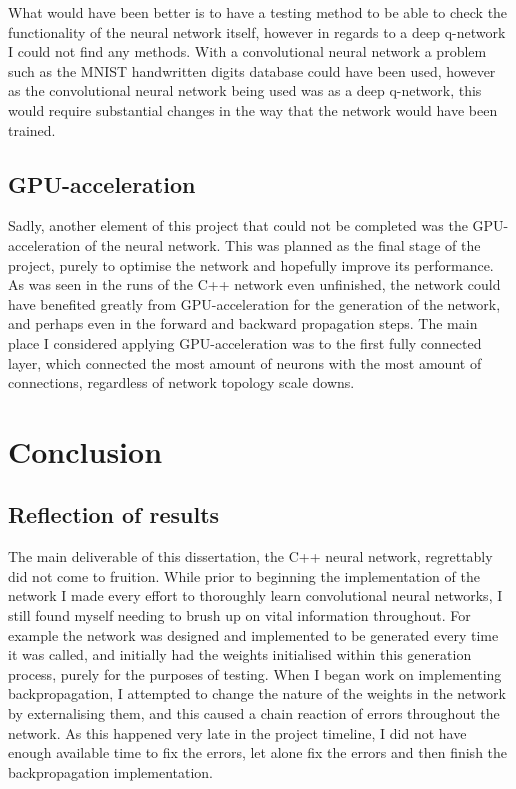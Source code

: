 \documentclass[10pt]{article}
\begin{document}
		What would have been better is to have a testing method to be able to check the functionality of the neural network itself, however in regards to a deep q-network I could not find any methods. With a convolutional neural network a problem such as the MNIST handwritten digits database could have been used, however as the convolutional neural network being used was as a deep q-network, this would require substantial changes in the way that the network would have been trained.
		
	\medskip
	
	\subsection{GPU-acceleration}
		Sadly, another element of this project that could not be completed was the GPU-acceleration of the neural network. This was planned as the final stage of the project, purely to optimise the network and hopefully improve its performance.\\
		
		As was seen in the runs of the C++ network even unfinished, the network could have benefited greatly from GPU-acceleration for the generation of the network, and perhaps even in the forward and backward propagation steps. The main place I considered applying GPU-acceleration was to the first fully connected layer, which connected the most amount of neurons with the most amount of connections, regardless of network topology scale downs.
	\bigskip
	
\section{Conclusion}
	\subsection{Reflection of results}
		The main deliverable of this dissertation, the C++ neural network, regrettably did not come to fruition. While prior to beginning the implementation of the network I made every effort to thoroughly learn convolutional neural networks, I still found myself needing to brush up on vital information throughout. For example the network was designed and implemented to be generated every time it was called, and initially had the weights initialised within this generation process, purely for the purposes of testing. When I began work on implementing backpropagation, I attempted to change the nature of the weights in the network by externalising them, and this caused a chain reaction of errors throughout the network. As this happened very late in the project timeline, I did not have enough available time to fix the errors, let alone fix the errors and then finish the backpropagation implementation.\\
		
\end{document}
